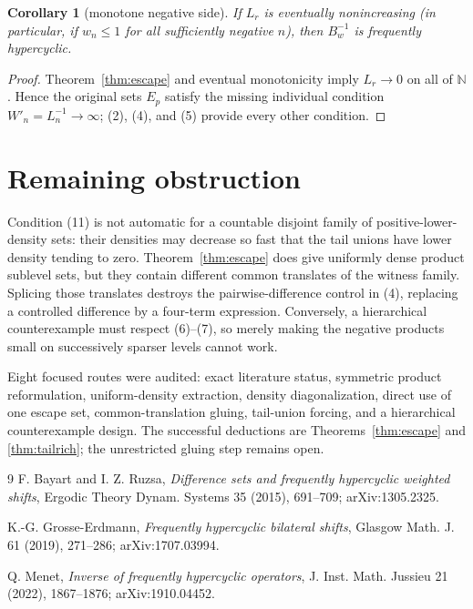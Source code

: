\documentclass[11pt]{article}
\newtheorem{corollary}[theorem]{Corollary}
\newcommand{\N}{\mathbb N}
\begin{document}
\begin{corollary}[monotone negative side]
If $L_r$ is eventually nonincreasing (in particular, if $w_n\leq1$ for all
sufficiently negative $n$), then $B_w^{-1}$ is frequently hypercyclic.
\end{corollary}

\begin{proof}
Theorem~\ref{thm:escape} and eventual monotonicity imply $L_r\to0$ on all of
$\N$.  Hence the original sets $E_p$ satisfy the missing individual condition
$W'_n=L_n^{-1}\to\infty$; (2), (4), and (5) provide every other condition.
\end{proof}

\section{Remaining obstruction}

Condition (11) is not automatic for a countable disjoint family of
positive-lower-density sets: their densities may decrease so fast that the
tail unions have lower density tending to zero.  Theorem~\ref{thm:escape}
does give uniformly dense product sublevel sets, but they contain different
common translates of the witness family.  Splicing those translates destroys
the pairwise-difference control in (4), replacing a controlled difference by
a four-term expression.  Conversely, a hierarchical counterexample must
respect (6)--(7), so merely making the negative products small on successively
sparser levels cannot work.

Eight focused routes were audited: exact literature status, symmetric product
reformulation, uniform-density extraction, density diagonalization, direct use
of one escape set, common-translation gluing, tail-union forcing, and a
hierarchical counterexample design.  The successful deductions are
Theorems~\ref{thm:escape} and \ref{thm:tailrich}; the unrestricted gluing step
remains open.

\begin{thebibliography}{9}
F. Bayart and I. Z. Ruzsa,
\emph{Difference sets and frequently hypercyclic weighted shifts},
Ergodic Theory Dynam. Systems 35 (2015), 691--709; arXiv:1305.2325.

K.-G. Grosse-Erdmann,
\emph{Frequently hypercyclic bilateral shifts},
Glasgow Math. J. 61 (2019), 271--286; arXiv:1707.03994.

Q. Menet,
\emph{Inverse of frequently hypercyclic operators},
J. Inst. Math. Jussieu 21 (2022), 1867--1876; arXiv:1910.04452.
\end{thebibliography}
\end{document}
